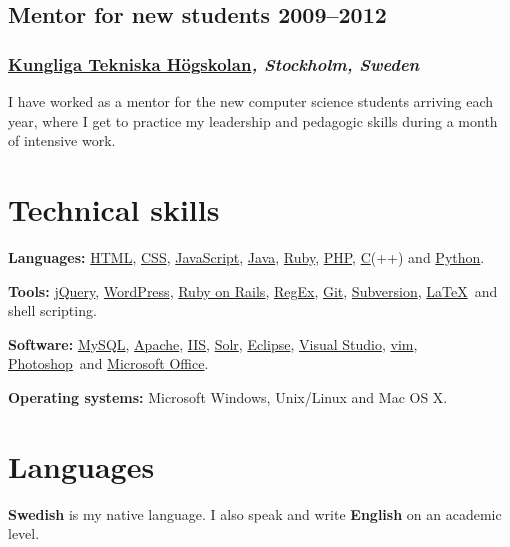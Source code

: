 \documentclass[a4paper,11pt]{article}
\newcommand{\thework}[2]{
  \subsection*{\textbf{#1} \hfill \textbf{#2}}\par%
}
\newcommand{\theplace}[2][]{%
  \subsubsection*{\textbf{#2}\textsl{#1}}%
}
\newcommand{\runin}[1]{%
  \vspace{2mm}
  \hspace{0mm}%
  {\normalsize \bfseries #1}%
}
\def\apache{\href{http://httpd.apache.org/}{Apache}}
\def\clang{\href{http://en.wikipedia.org/wiki/C_\%28programming_language\%29}{C}}
\def\css{\href{http://en.wikipedia.org/wiki/Cascading_Style_Sheets}{CSS}}
\def\eclipse{\href{http://www.eclipse.org/eclipse/}{Eclipse}}
\def\git{\href{http://git-scm.com/}{Git}}
\def\html{\href{http://en.wikipedia.org/wiki/HTML}{HTML}}
\def\iis{\href{http://www.iis.net/}{IIS}}
\def\java{\href{http://www.java.com/}{Java}}
\def\javascript{\href{http://en.wikipedia.org/wiki/JavaScript}{JavaScript}}
\def\jquery{\href{http://jquery.com/}{jQuery}}
\def\latex{\href{http://en.wikipedia.org/wiki/LaTeX}{LaTeX}}
\def\mysql{\href{http://www.mysql.com/}{MySQL}}
\def\office{\href{http://office.microsoft.com/}{Microsoft Office}}
\def\photoshop{\href{http://www.adobe.com/products/photoshop.html}{Photoshop}}
\def\php{\href{http://php.net}{PHP}}
\def\python{\href{http://www.python.org/}{Python}}
\def\regex{\href{http://en.wikipedia.org/wiki/Regular_expressions}{RegEx}}
\def\ror{\href{http://rubyonrails.org}{Ruby on Rails}}
\def\ruby{\href{http://www.ruby-lang.org/}{Ruby}}
\def\solr{\href{http://lucene.apache.org/solr/}{Solr}}
\def\svn{\href{http://subversion.apache.org/}{Subversion}}
\def\vim{\href{http://www.vim.org/}{vim}}
\def\wordpress{\href{http://wordpress.org}{WordPress}}
\def\vs{\href{http://www.microsoft.com/visualstudio/}{Visual Studio}}
\begin{document}
\thework{Mentor for new students}{2009--2012}
\theplace[, Stockholm, Sweden]{\href{http://kth.se}{Kungliga Tekniska Högskolan}}
I have worked as a mentor for the new computer science students arriving each year, where I get to practice my leadership and pedagogic skills during a month of intensive work.

\section*{Technical skills}%
\vspace{-2mm}

\runin{Languages:} \html, \css, \javascript, \java, \ruby, \php, \clang(++) and \python.

\runin{Tools:} \jquery, \wordpress, \ror, \regex, \git, \svn, \latex\ and shell scripting.

\runin{Software:} \mysql, \apache, \iis, \solr, \eclipse, \vs, \vim, \photoshop\ and \office.

\runin{Operating systems:} Microsoft Windows, Unix/Linux and Mac OS X.

\section*{Languages}%
\textbf{Swedish} is my native language. I also speak and write \textbf{English} on an academic level.
\end{document}
